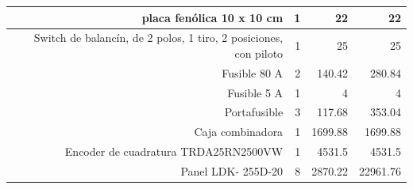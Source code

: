 \begin{landscape}
\begin{longtable}{|r|r|r|l|r|}
\hline
\cmidrule{Energético}    \rowcolor[rgb]{ .851,  .851,  .851}       & \multicolumn{1}{p{16.43em}|}{\cellcolor[rgb]{ 1,  1,  1}placa fenólica 10 x 10 cm} & \cellcolor[rgb]{ 1,  1,  1}1 & \multicolumn{1}{r|}{\cellcolor[rgb]{ 1,  1,  1}22} & \cellcolor[rgb]{ 1,  1,  1}22 \\
\hline
\cmidrule{Energético}    \rowcolor[rgb]{ .851,  .851,  .851}       & \multicolumn{1}{p{16.43em}|}{\cellcolor[rgb]{ 1,  1,  1}Switch de balancín, de 2 polos, 1 tiro, 2 posiciones, con piloto} & \cellcolor[rgb]{ 1,  1,  1}1 & \multicolumn{1}{r|}{\cellcolor[rgb]{ 1,  1,  1}25} & \cellcolor[rgb]{ 1,  1,  1}25 \\
\hline
\cmidrule{Energético}    \rowcolor[rgb]{ .851,  .851,  .851}       & \multicolumn{1}{p{16.43em}|}{\cellcolor[rgb]{ 1,  1,  1}Fusible 80 A} & \cellcolor[rgb]{ 1,  1,  1}2 & \multicolumn{1}{r|}{\cellcolor[rgb]{ 1,  1,  1}140.42} & \cellcolor[rgb]{ 1,  1,  1}280.84 \\
\hline
\cmidrule{Energético}    \rowcolor[rgb]{ .851,  .851,  .851}       & \multicolumn{1}{p{16.43em}|}{\cellcolor[rgb]{ 1,  1,  1}Fusible 5 A} & \cellcolor[rgb]{ 1,  1,  1}1 & \multicolumn{1}{r|}{\cellcolor[rgb]{ 1,  1,  1}4} & \cellcolor[rgb]{ 1,  1,  1}4 \\
\hline
\cmidrule{Energético}    \rowcolor[rgb]{ .851,  .851,  .851}       & \multicolumn{1}{p{16.43em}|}{\cellcolor[rgb]{ 1,  1,  1}Portafusible} & \cellcolor[rgb]{ 1,  1,  1}3 & \multicolumn{1}{r|}{\cellcolor[rgb]{ 1,  1,  1}117.68} & \cellcolor[rgb]{ 1,  1,  1}353.04 \\
\hline
\cmidrule{Energético}    \rowcolor[rgb]{ .851,  .851,  .851}       & \multicolumn{1}{p{16.43em}|}{\cellcolor[rgb]{ 1,  1,  1}Caja combinadora} & \cellcolor[rgb]{ 1,  1,  1}1 & \multicolumn{1}{r|}{\cellcolor[rgb]{ 1,  1,  1}1699.88} & \cellcolor[rgb]{ 1,  1,  1}1699.88 \\
\hline
    \midrule
    \rowcolor[rgb]{ .988,  .894,  .839} \multicolumn{1}{|p{5.355em}|}{Azimutal} & \multicolumn{1}{p{16.43em}|}{\cellcolor[rgb]{ 1,  1,  1}Encoder de cuadratura TRDA25RN2500VW} & \cellcolor[rgb]{ 1,  1,  1}1 & \multicolumn{1}{r|}{\cellcolor[rgb]{ 1,  1,  1}4531.5} & \cellcolor[rgb]{ 1,  1,  1}4531.5 \\
    \hline
    \rowcolor[rgb]{ .867,  .922,  .969} \multicolumn{1}{|p{5.355em}|}{Colector} & \multicolumn{1}{p{16.43em}|}{\cellcolor[rgb]{ 1,  1,  1}Panel LDK- 255D-20} & \cellcolor[rgb]{ 1,  1,  1}8 & \multicolumn{1}{r|}{\cellcolor[rgb]{ 1,  1,  1}2870.22} & \cellcolor[rgb]{ 1,  1,  1}22961.76 \\

\end{longtable}
\end{landscape}
